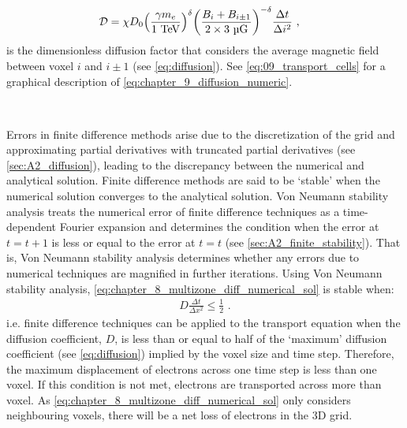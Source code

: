 \begin{equation}
    \begin{aligned}
    \mathcal{D}&=\chi D_0 \qty(\frac{\gamma m_e}{1~\TeV})^\delta \qty(\frac{B_i + B_{i\pm 1}}{2\times 3~\si{\micro G}})^{-\delta} \frac{\Delta t}{\Delta i^2}\text{ ,} 
    \end{aligned} \label{eq:chapter_9_diffusion_numeric}
\end{equation}
\noindent is the dimensionless diffusion factor that considers the average magnetic field between voxel $i$ and $i\pm 1$ (see \autoref{eq:diffusion}). See \autoref{eq:09_transport_cells} for a graphical description of \autoref{eq:chapter_9_diffusion_numeric}. 
\par~\par 
Errors in finite difference methods arise due to the discretization of the grid and approximating partial derivatives with truncated partial derivatives (see \autoref{sec:A2_diffusion}), leading to the discrepancy between the numerical and analytical solution. Finite difference methods are said to be `stable' when the numerical solution converges to the analytical solution. Von Neumann stability analysis treats the numerical error of finite difference techniques as a time-dependent Fourier expansion and determines the condition when the error at $t=t+1$ is less or equal to the error at $t=t$ (see \autoref{sec:A2_finite_stability}). That is, Von Neumann stability analysis determines whether any errors due to numerical techniques are magnified in further iterations. Using Von Neumann stability analysis, \autoref{eq:chapter_8_multizone_diff_numerical_sol} is stable when:
\begin{equation}
    \begin{aligned}
    D\frac{\Delta t}{\Delta x^2}\leq \frac{1}{2}\text{ .} 
    \end{aligned} \label{eq:09_finite_difference_diff_stable}
\end{equation}
\noindent i.e. finite difference techniques can be applied to the transport equation when the diffusion coefficient, $D$, is less than or equal to half of the `maximum' diffusion coefficient (see \autoref{eq:diffusion}) implied by the voxel size and time step. Therefore, the maximum displacement of electrons across one time step is less than one voxel. If this condition is not met, electrons are transported across more than voxel. As \autoref{eq:chapter_8_multizone_diff_numerical_sol} only considers neighbouring voxels, there will be a net loss of electrons in the 3D grid.

